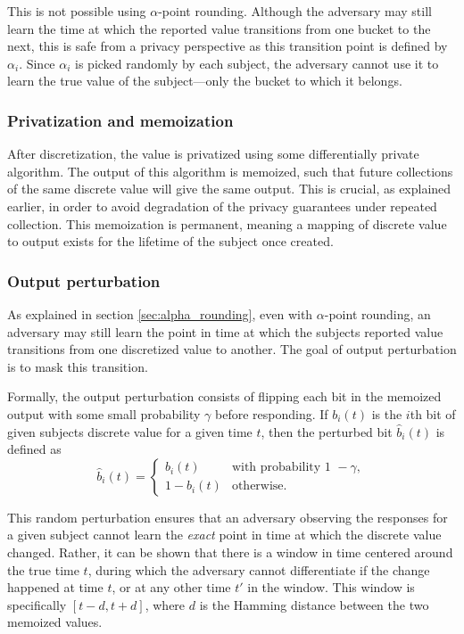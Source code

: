 \documentclass[12pt]{article}
\begin{document}
This is not possible using $\alpha$-point rounding. Although the adversary may still learn the time at which the reported value transitions from one bucket to the next, this is safe from a privacy perspective as this transition point is defined by $\alpha_i$. Since $\alpha_i$ is picked randomly by each subject, the adversary cannot use it to learn the true value of the subject---only the bucket to which it belongs.

\subsubsection{Privatization and memoization}

After discretization, the value is privatized using some differentially private algorithm. The output of this algorithm is memoized, such that future collections of the same discrete value will give the same output. This is crucial, as explained earlier, in order to avoid degradation of the privacy guarantees under repeated collection. This memoization is permanent, meaning a mapping of discrete value to output exists for the lifetime of the subject once created.

\subsubsection{Output perturbation}

As explained in section \ref{sec:alpha_rounding}, even with $\alpha$-point rounding, an adversary may still learn the point in time at which the subjects reported value transitions from one discretized value to another. The goal of output perturbation is to mask this transition.

Formally, the output perturbation consists of flipping each bit in the memoized output with some small probability $\gamma$ before responding. If $b_i(t)$ is the $i$th bit of given subjects discrete value for a given time $t$, then the perturbed bit $\hat{b}_i(t)$ is defined as $$\hat{b}_i(t)=\begin{cases}
b_i(t) & \text{with probability 1 } - \gamma, \\
1 - b_i(t) & \text{otherwise.}
\end{cases}$$

This random perturbation ensures that an adversary observing the responses for a given subject cannot learn the \emph{exact} point in time at which the discrete value changed. Rather, it can be shown \cite[sec.~4]{microsoft_telemetry} that there is a window in time centered around the true time $t$, during which the adversary cannot differentiate if the change happened at time $t$, or at any other time $t'$ in the window. This window is specifically $[t-d, t+d]$, where $d$ is the Hamming distance between the two memoized values.
\end{document}
